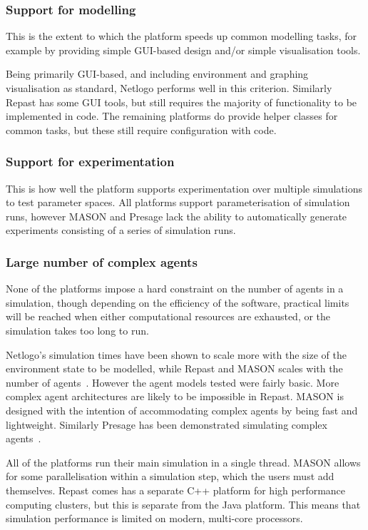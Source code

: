 \subsubsection*{Support for modelling}

This is the extent to which the platform speeds up common modelling tasks, for example by providing simple \ac{GUI}-based design and/or simple visualisation tools.

Being primarily \ac{GUI}-based, and including environment and graphing visualisation as standard, Netlogo performs well in this criterion. Similarly Repast has some \ac{GUI} tools, but still requires the majority of functionality to be implemented in code. The remaining platforms do provide helper classes for common tasks, but these still require configuration with code.

\subsubsection*{Support for experimentation}

This is how well the platform supports experimentation over multiple simulations to test parameter spaces. All platforms support parameterisation of simulation runs, however MASON and Presage lack the ability to automatically generate experiments consisting of a series of simulation runs.

\subsubsection*{Large number of complex agents}

None of the platforms impose a hard constraint on the number of agents in a simulation, though depending on the efficiency of the software, practical limits will be reached when either computational resources are exhausted, or the simulation takes too long to run.

Netlogo's simulation times have been shown to scale more with the size of the environment state to be modelled, while Repast and MASON scales with the number of agents~\citet{Railsback2006}.  However the agent models tested were fairly basic. More complex agent architectures are likely to be impossible in Repast. MASON is designed with the intention of accommodating complex agents by being fast and lightweight. Similarly Presage has been demonstrated simulating complex agents~\citet{Pitt2011}.

All of the platforms run their main simulation in a single thread. MASON allows for some parallelisation within a simulation step, which the users must add themselves. Repast comes has a separate C++ platform for high performance computing clusters, but this is separate from the Java platform. This means that simulation performance is limited on modern, multi-core processors.

